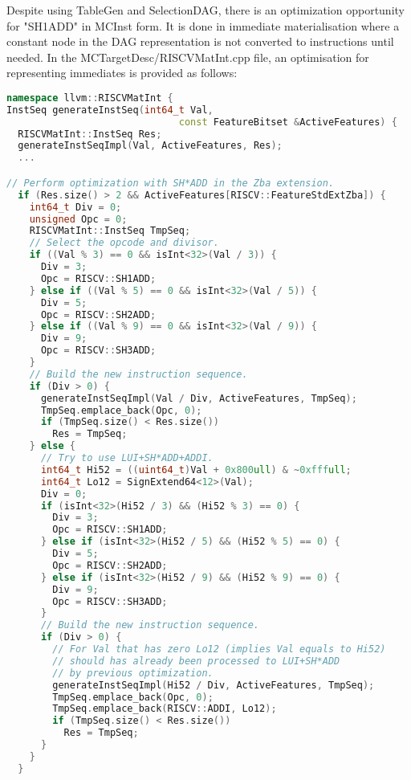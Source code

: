 Despite using TableGen and SelectionDAG, there is an optimization opportunity for "SH1ADD" in MCInst form. It is done in immediate materialisation where a constant node in the DAG representation is not converted to instructions until needed. In the MCTargetDesc/RISCVMatInt.cpp file, an optimisation for representing immediates is provided as follows:

\begin{lstlisting}[language=C++, caption={Immediate Materialisation for "SH1ADD"}]
namespace llvm::RISCVMatInt {
InstSeq generateInstSeq(int64_t Val,
                              const FeatureBitset &ActiveFeatures) {
  RISCVMatInt::InstSeq Res;
  generateInstSeqImpl(Val, ActiveFeatures, Res);
  ...

// Perform optimization with SH*ADD in the Zba extension.
  if (Res.size() > 2 && ActiveFeatures[RISCV::FeatureStdExtZba]) {
    int64_t Div = 0;
    unsigned Opc = 0;
    RISCVMatInt::InstSeq TmpSeq;
    // Select the opcode and divisor.
    if ((Val % 3) == 0 && isInt<32>(Val / 3)) {
      Div = 3;
      Opc = RISCV::SH1ADD;
    } else if ((Val % 5) == 0 && isInt<32>(Val / 5)) {
      Div = 5;
      Opc = RISCV::SH2ADD;
    } else if ((Val % 9) == 0 && isInt<32>(Val / 9)) {
      Div = 9;
      Opc = RISCV::SH3ADD;
    }
    // Build the new instruction sequence.
    if (Div > 0) {
      generateInstSeqImpl(Val / Div, ActiveFeatures, TmpSeq);
      TmpSeq.emplace_back(Opc, 0);
      if (TmpSeq.size() < Res.size())
        Res = TmpSeq;
    } else {
      // Try to use LUI+SH*ADD+ADDI.
      int64_t Hi52 = ((uint64_t)Val + 0x800ull) & ~0xfffull;
      int64_t Lo12 = SignExtend64<12>(Val);
      Div = 0;
      if (isInt<32>(Hi52 / 3) && (Hi52 % 3) == 0) {
        Div = 3;
        Opc = RISCV::SH1ADD;
      } else if (isInt<32>(Hi52 / 5) && (Hi52 % 5) == 0) {
        Div = 5;
        Opc = RISCV::SH2ADD;
      } else if (isInt<32>(Hi52 / 9) && (Hi52 % 9) == 0) {
        Div = 9;
        Opc = RISCV::SH3ADD;
      }
      // Build the new instruction sequence.
      if (Div > 0) {
        // For Val that has zero Lo12 (implies Val equals to Hi52) 
        // should has already been processed to LUI+SH*ADD
        // by previous optimization.
        generateInstSeqImpl(Hi52 / Div, ActiveFeatures, TmpSeq);
        TmpSeq.emplace_back(Opc, 0);
        TmpSeq.emplace_back(RISCV::ADDI, Lo12);
        if (TmpSeq.size() < Res.size())
          Res = TmpSeq;
      }
    }
  }

\end{lstlisting}


